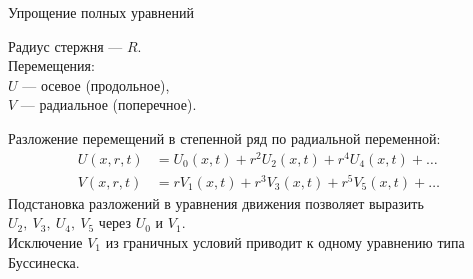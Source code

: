 \documentclass[usenames,dvipsnames]{beamer}
\newcommand{\vect}[1]{\underline{#1}}
\begin{document}
\begin{frame}{Упрощение полных уравнений}
\begin{itemize}
\begin{minipage}{.36\textwidth}
		\footnotesize
		Радиус стержня --- $R$.\\
		Перемещения:\\
		$U$ --- осевое (продольное), \\
		$V$ --- радиальное (поперечное).
	\end{minipage}
\end{itemize}
\setlength{\belowdisplayskip}{1pt} \setlength{\belowdisplayshortskip}{0pt}
\setlength{\abovedisplayskip}{1pt} \setlength{\abovedisplayshortskip}{0pt}
Разложение перемещений в степенной ряд по радиальной переменной:
\begin{align*}
U(x,r,t) &= U_0(x,t) + r^2 U_2(x,t) + r^4 U_4(x,t) + \dots \\
V(x,r,t) &= r V_1(x,t) + r^3 V_3(x,t) + r^5 V_5(x,t) + \dots \,
\end{align*}
Подстановка разложений в уравнения движения позволяет выразить $U_2,\ V_3,\ U_4,\ V_5$ через $U_0$ и $V_1$. \\
\vspace{1mm}
Исключение $V_1$ из граничных условий приводит к одному уравнению типа Буссинеска.
\end{frame}
\end{document}

